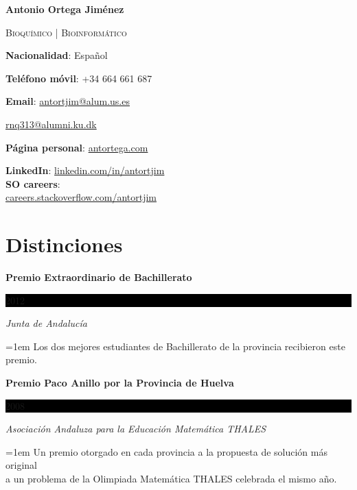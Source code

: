 \documentclass[paper=a4,fontsize=11pt]{article} %
\newcommand{\sepspace}{\vspace*{1em}}		%
\newcommand{\MyName}[1]{ %
		\Huge \usefont{OT1}{phv}{b}{n} \hfill #1
		\par \normalsize \normalfont}
\newcommand{\MySlogan}[1]{ %
		\large \usefont{OT1}{phv}{m}{n}\hfill \textit{#1}
		\par \normalsize \normalfont}
\newcommand{\NewPart}[1]{\section*{
									{#1}}}
\newcommand{\AwardEntry}[4]{
		\noindent \textbf{#1} \hfill      %
		\colorbox{Black}{%
			\parbox{3em}{%
			\hfill\color{White}#2}} \par  %
		\noindent \textit{#3} \par        %
		\noindent\hangindent=1em\hangafter=0 \small #4 %
		\normalsize \par}
\begin{document}

%


\def\name{\textcolor{StrongRed}{Antonio Ortega Jim\'enez}}

\centerline{\LARGE\bf \name}
\vspace{0.1in}
\centerline{\textcolor{awesome-red}{\textsc{Bioquímico | Bioinformático}}}
\vspace{0.25in}



\begin{minipage}[t]{0.6\textwidth}
  \textbf{Nacionalidad}: Español \par
  \textbf{Teléfono móvil}: +34 664 661 687 \par
  \textbf{Email}: \href{mailto:antortjim@alum.us.es}{antortjim@alum.us.es} \par
  \leftskip=1.1cm  \href{mailto:rnq313@alumni.ku.dk}{rnq313@alumni.ku.dk} \par
  \leftskip=0cm \textbf{Página personal}: \href{http://www.antortega.com}{antortega.com} \par
  
\end{minipage}
\begin{minipage}[t]{0.3\textwidth}
  \textbf{LinkedIn}: \href{http://www.linkedin.com/in/antortjim}{linkedin.com/in/antortjim} \\
   \textbf{SO careers}:\\
   \href{http://careers.stackoverflow.com/antortjim}{careers.stackoverflow.com/antortjim} \\

\end{minipage}

\NewPart{Distinciones}{}

\AwardEntry{Premio Extraordinario de Bachillerato}{2012}{Junta de Andalucía}{Los dos mejores estudiantes de Bachillerato de la provincia recibieron este premio.}
\sepspace

\AwardEntry{Premio Paco Anillo por la Provincia de Huelva}{2008}{Asociación Andaluza para la Educación Matemática THALES}{Un premio otorgado en cada provincia a la propuesta de solución más original \\a un problema de la Olimpiada Matemática THALES celebrada el mismo año.}
\end{document}
